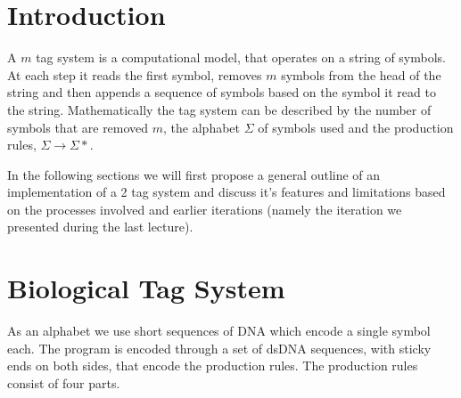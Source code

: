 \documentclass[
11pt, %
a4paper, %
oneside, %
headinclude,footinclude, %
BCOR5mm, %
]{scrartcl}
\begin{document}




\newpage %


\section{Introduction}

A $m$ tag system is a computational model, that operates on a string of symbols.
At each step it reads the first symbol, removes $m$ symbols from the head of the
string and then appends a sequence of symbols based on the symbol it read to the
string.
Mathematically the tag system can be described by the number of symbols that
are removed $m$, the alphabet $\Sigma$ of symbols used and the production rules,
$\Sigma \to \Sigma*$.


In the following sections we will first propose a general outline of an
implementation of a 2 tag system and discuss it's features and limitations
based on the processes involved and earlier iterations (namely the iteration
we presented during the last lecture).

\section{Biological Tag System}

As an alphabet we use short sequences of DNA which encode a single symbol each.
The program is encoded through a set of dsDNA sequences, with sticky ends on
both sides, that encode the production rules.
The production rules consist of four parts.
\end{document}
